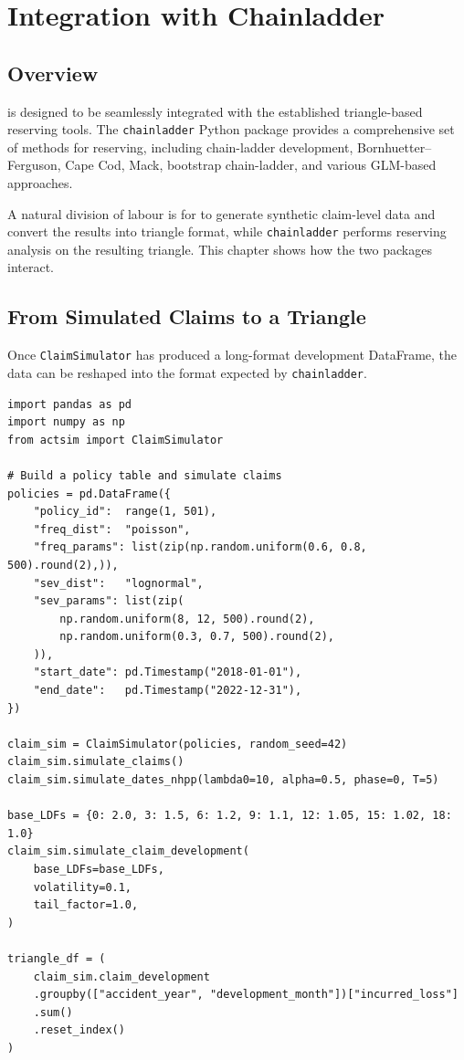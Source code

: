 \chapter{Integration with Chainladder}
\label{chap:chainladder}

\section{Overview}

\actsim is designed to be seamlessly integrated with the established
triangle-based reserving tools. The \texttt{chainladder} Python package
provides a comprehensive set of methods for reserving, including
chain-ladder development, Bornhuetter--Ferguson, Cape Cod, Mack,
bootstrap chain-ladder, and various GLM-based approaches.

A natural division of labour is for \actsim to generate synthetic
claim-level data and convert the results into triangle format, while
\texttt{chainladder} performs reserving analysis on the resulting
triangle. This chapter shows how the two packages interact.

\section{From Simulated Claims to a Triangle}

Once \texttt{ClaimSimulator} has produced a long-format development
DataFrame, the data can be reshaped into the format expected by
\texttt{chainladder}.

\begin{lstlisting}[style=pythonstyle]
import pandas as pd
import numpy as np
from actsim import ClaimSimulator

# Build a policy table and simulate claims
policies = pd.DataFrame({
    "policy_id":  range(1, 501),
    "freq_dist":  "poisson",
    "freq_params": list(zip(np.random.uniform(0.6, 0.8, 500).round(2),)),
    "sev_dist":   "lognormal",
    "sev_params": list(zip(
        np.random.uniform(8, 12, 500).round(2),
        np.random.uniform(0.3, 0.7, 500).round(2),
    )),
    "start_date": pd.Timestamp("2018-01-01"),
    "end_date":   pd.Timestamp("2022-12-31"),
})

claim_sim = ClaimSimulator(policies, random_seed=42)
claim_sim.simulate_claims()
claim_sim.simulate_dates_nhpp(lambda0=10, alpha=0.5, phase=0, T=5)

base_LDFs = {0: 2.0, 3: 1.5, 6: 1.2, 9: 1.1, 12: 1.05, 15: 1.02, 18: 1.0}
claim_sim.simulate_claim_development(
    base_LDFs=base_LDFs,
    volatility=0.1,
    tail_factor=1.0,
)

triangle_df = (
    claim_sim.claim_development
    .groupby(["accident_year", "development_month"])["incurred_loss"]
    .sum()
    .reset_index()
)
\end{lstlisting}


